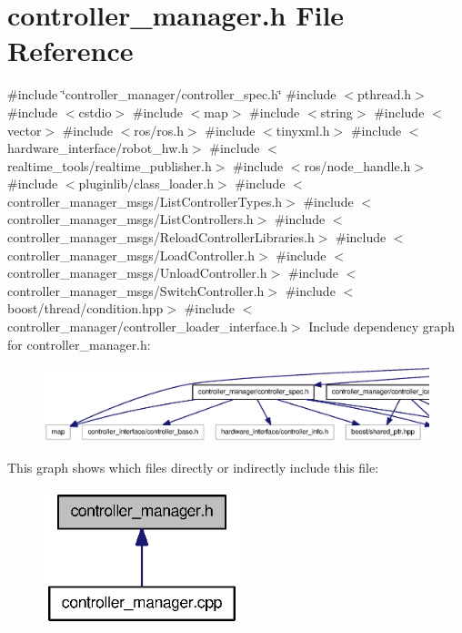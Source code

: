 \section{controller\-\_\-manager.\-h \-File \-Reference}
\label{controller__manager_8h}
{\ttfamily \#include \char`\"{}controller\-\_\-manager/controller\-\_\-spec.\-h\char`\"{}}\*
{\ttfamily \#include $<$pthread.\-h$>$}\*
{\ttfamily \#include $<$cstdio$>$}\*
{\ttfamily \#include $<$map$>$}\*
{\ttfamily \#include $<$string$>$}\*
{\ttfamily \#include $<$vector$>$}\*
{\ttfamily \#include $<$ros/ros.\-h$>$}\*
{\ttfamily \#include $<$tinyxml.\-h$>$}\*
{\ttfamily \#include $<$hardware\-\_\-interface/robot\-\_\-hw.\-h$>$}\*
{\ttfamily \#include $<$realtime\-\_\-tools/realtime\-\_\-publisher.\-h$>$}\*
{\ttfamily \#include $<$ros/node\-\_\-handle.\-h$>$}\*
{\ttfamily \#include $<$pluginlib/class\-\_\-loader.\-h$>$}\*
{\ttfamily \#include $<$controller\-\_\-manager\-\_\-msgs/\-List\-Controller\-Types.\-h$>$}\*
{\ttfamily \#include $<$controller\-\_\-manager\-\_\-msgs/\-List\-Controllers.\-h$>$}\*
{\ttfamily \#include $<$controller\-\_\-manager\-\_\-msgs/\-Reload\-Controller\-Libraries.\-h$>$}\*
{\ttfamily \#include $<$controller\-\_\-manager\-\_\-msgs/\-Load\-Controller.\-h$>$}\*
{\ttfamily \#include $<$controller\-\_\-manager\-\_\-msgs/\-Unload\-Controller.\-h$>$}\*
{\ttfamily \#include $<$controller\-\_\-manager\-\_\-msgs/\-Switch\-Controller.\-h$>$}\*
{\ttfamily \#include $<$boost/thread/condition.\-hpp$>$}\*
{\ttfamily \#include $<$controller\-\_\-manager/controller\-\_\-loader\-\_\-interface.\-h$>$}\*
\-Include dependency graph for controller\-\_\-manager.\-h\-:
\nopagebreak
\begin{figure}[H]
\begin{center}
\leavevmode
\includegraphics[width=350pt]{controller__manager_8h__incl}
\end{center}
\end{figure}
\-This graph shows which files directly or indirectly include this file\-:
\nopagebreak
\begin{figure}[H]
\begin{center}
\leavevmode
\includegraphics[width=162pt]{controller__manager_8h__dep__incl}
\end{center}
\end{figure}

